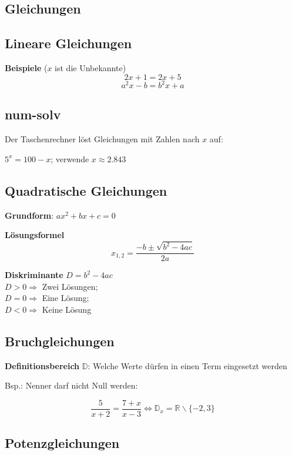 \begin{multicols}{2}
\hrulefill
\section*{Gleichungen}

\subsection*{Lineare Gleichungen}

\textbf{Beispiele} ($x$ ist die Unbekannte)
$$2x+1= 2x+5$$
$$a^2x-b=b^2x+a$$


\subsection*{num-solv}
Der Taschenrechner löst Gleichungen mit Zahlen nach $x$ auf:

$5^x = 100 -x$; verwende  $x\approx{}2.843$

\forceCB
\subsection*{Quadratische Gleichungen}

\textbf{Grundform}: $ax^2 + bx+c = 0$

\begin{tcolorbox}[colback=white]
  \textbf{Lösungsformel}
  $$x_{1,2} = \frac{-b \pm \sqrt{b^2-4ac}}{2a}$$
\end{tcolorbox}
\textbf{Diskriminante} $D = b^2-4ac$\\
$D>0\Longrightarrow$ Zwei Lösungen;\\
$D=0\Longrightarrow$ Eine Lösung;\\
$D<0\Longrightarrow$ Keine Lösung


\subsection*{Bruchgleichungen}

\textbf{Definitionsbereich} $\mathbb{D}$: Welche Werte dürfen in einen Term eingesetzt werden

Bsp.: Nenner darf nicht Null werden:

$$\frac5{x+2}=\frac{7+x}{x-3} \Leftrightarrow{} \mathbb{D}_x=\mathbb{R}\backslash{}\{-2, 3\}$$

\subsection*{Potenzgleichungen}


\end{multicols}
